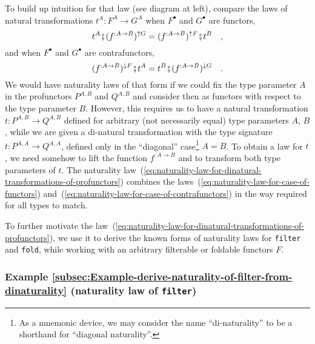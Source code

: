 To build up intuition for that law (see diagram at left), compare
the laws of natural transformations $t^{A}:F^{A}\rightarrow G^{A}$
when $F^{\bullet}$ and $G^{\bullet}$ are functors,
\begin{equation}
t^{A}\bef(f^{:A\rightarrow B})^{\uparrow G}=(f^{:A\rightarrow B})^{\uparrow F}\bef t^{B}\quad,\label{eq:naturality-law-for-case-of-functors}
\end{equation}
and when $F^{\bullet}$ and $G^{\bullet}$ are contrafunctors,
\begin{equation}
(f^{:A\rightarrow B})^{\downarrow F}\bef t^{A}=t^{B}\bef(f^{:A\rightarrow B})^{\downarrow G}\quad.\label{eq:naturality-law-for-case-of-contrafunctors}
\end{equation}
We would have naturality laws of that form if we could fix the type
parameter $A$ in the profunctors $P^{A,B}$ and $Q^{A,B}$ and consider
then as functors with respect to the type parameter $B$. However,
this requires us to have a natural transformation $t:P^{A,B}\rightarrow Q^{A,B}$
defined for arbitrary (not necessarily equal) type parameters $A$,
$B$, while we are given a di-natural transformation with the type
signature $t:P^{A,A}\rightarrow Q^{A,A}$, defined only in the ``diagonal''
case\footnote{As a mnemonic device, we may consider the name ``di-naturality''
to be a shorthand for ``diagonal naturality''.} $A=B$. To obtain a law for $t$, we need somehow to lift the function
$f^{:A\rightarrow B}$ and to transform both type parameters of $t$.
The naturality law~(\ref{eq:naturality-law-for-dinatural-transformations-of-profunctors})
combines the laws~(\ref{eq:naturality-law-for-case-of-functors})
and~(\ref{eq:naturality-law-for-case-of-contrafunctors}) in the
way required for all types to match. 

To further motivate the law~(\ref{eq:naturality-law-for-dinatural-transformations-of-profunctors}),
we use it to derive the known forms of naturality laws for \lstinline!filter!
and \lstinline!fold!, while working with an arbitrary filterable
or foldable functors $F$.

\subsubsection{Example \label{subsec:Example-derive-naturality-of-filter-from-dinaturality}\ref{subsec:Example-derive-naturality-of-filter-from-dinaturality}
(naturality law of \lstinline!filter!)}

